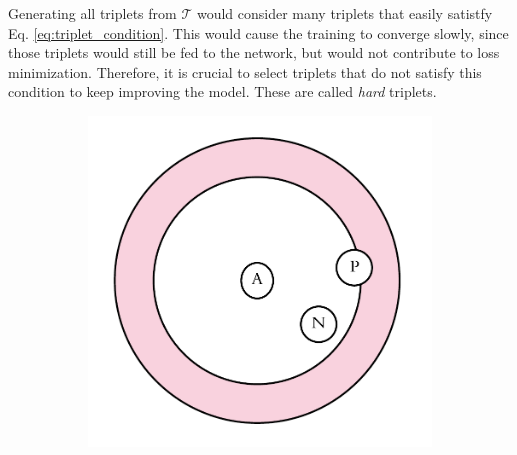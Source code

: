 Generating all triplets from $\mathcal{T}$ would consider many triplets that easily satistfy Eq. \ref{eq:triplet_condition}. This would cause the training to converge slowly, since those triplets would still be fed to the network, but would not contribute to loss minimization. Therefore, it is crucial to select triplets that do not satisfy this condition to keep improving the model. These are called \textit{hard} triplets.

\begin{figure}[ht]
	\centering
	\begin{subfigure}[t]{0.25\textwidth}
		\includegraphics[width=\linewidth]{imgs/triplet_loss_before.pdf}
		\subcaption{}\label{fig:triplet:a}
	\end{subfigure}%
	\hspace{1cm}%
	\begin{subfigure}[t]{0.25\textwidth}

\end{subfigure}
\end{figure}
